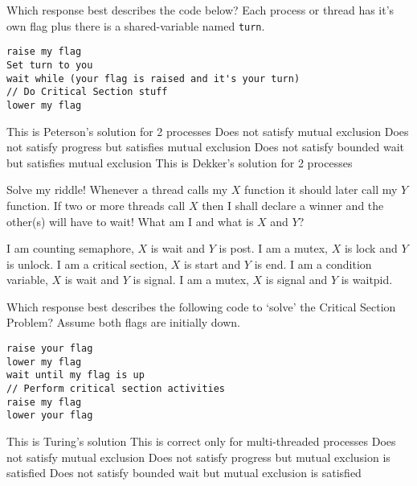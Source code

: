 \variant
Which response best describes the code below? Each process or thread has it's own flag plus there is a shared-variable named {\tt turn}.
\begin{verbatim}
raise my flag
Set turn to you
wait while (your flag is raised and it's your turn)
// Do Critical Section stuff
lower my flag
\end{verbatim}
\begin{answers}
\correctanswer This is Peterson's solution for 2 processes
\answer Does not satisfy mutual exclusion
\answer Does not satisfy progress but satisfies mutual exclusion
\answer Does not satisfy bounded wait but satisfies mutual exclusion
\answer This is Dekker's solution for 2 processes
\end{answers}
\begin{solution}
\end{solution}


\variant
Solve my riddle! Whenever a thread calls my $X$ function it should later call my $Y$ function. If two or more threads call $X$ then I shall declare a winner and the other(s) will have to wait! What am I and what is $X$ and $Y$?
\begin{answers}
\answer I am counting semaphore, $X$ is wait and $Y$ is post.
\correctanswer I am a mutex, $X$ is lock and $Y$ is unlock. 
\answer I am a critical section, $X$ is start and $Y$ is end. 
\answer I am a condition variable, $X$ is wait and $Y$ is signal. 
\answer I am a mutex, $X$ is signal and $Y$ is waitpid. 
\end{answers}
\begin{solution}
\end{solution}






\variant
Which response best describes the following code to `solve' the Critical Section Problem? Assume both flags are initially down.
\begin{verbatim}
raise your flag
lower my flag
wait until my flag is up
// Perform critical section activities
raise my flag
lower your flag
\end{verbatim}
\begin{answers}
\answer This is Turing's solution
\answer This is correct only for multi-threaded processes
\answer Does not satisfy mutual exclusion
\correctanswer Does not satisfy progress but mutual exclusion is satisfied
\answer Does not satisfy bounded wait but mutual exclusion is satisfied
\end{answers}
\begin{solution}
\end{solution}



